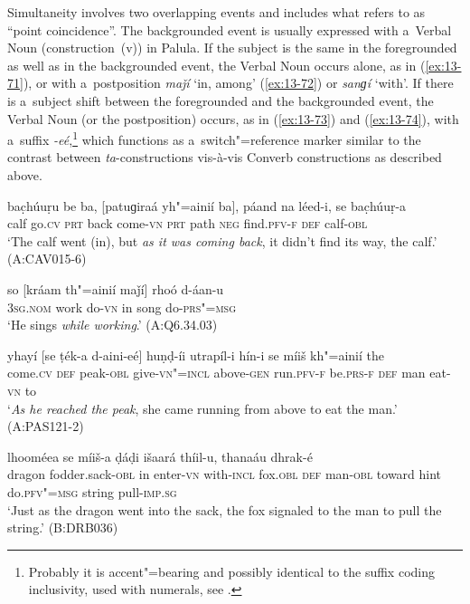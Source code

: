  Simultaneity involves two overlapping events and includes what
\citet[330]{givon2001b} refers to as ``point coincidence''. The backgrounded event
\citep[254--255]{thompsonetal2007} is usually expressed with a~Verbal Noun (construction~(v)) in
Palula. If the subject is the same in the foregrounded as well as in the backgrounded event, the
Verbal Noun occurs alone, as in (\ref{ex:13-71}), or with a~postposition \textit{maǰí} `in,
among' (\ref{ex:13-72}) or \textit{sanɡí} `with'. If there is a~subject shift between
the foregrounded and the backgrounded event, the Verbal Noun (or the postposition) occurs, as in
(\ref{ex:13-73}) and (\ref{ex:13-74}), with a~suffix \textit{-eé},\footnote{Probably it is accent"=bearing and possibly identical to the suffix coding inclusivity, used with numerals, see .} which functions as a~switch"=reference marker similar to the contrast between
\textit{ta}-constructions vis-à-vis Converb constructions as described above.

\begin{exe}
\ex
\label{ex:13-71}
\gll bac̣húuṛu be ba, [patuɡiraá yh"=ainií ba], páand na léed-i, se bac̣húuṛ-a \\
calf go.\textsc{cv} \textsc{prt } back come-\textsc{vn }  \textsc{prt} path \textsc{neg} find.\textsc{pfv-f} \textsc{def} calf-\textsc{obl}  \\
\glt `The calf went (in), but \textit{as it was coming back}, it didn't find its way, the calf.' (A:CAV015-6)

\ex
\label{ex:13-72}
\gll so [kráam th"=ainií maǰí] rhoó d-áan-u  \\
\textsc{3sg.nom} work do-\textsc{vn} in song do-\textsc{prs"=msg}  \\
\glt `He sings \textit{while working}.' (A:Q6.34.03)

\ex
\label{ex:13-73}
\gll yhayí [se ṭék-a d-aini-eé] huṇḍ-íi utrapíl-i hín-i se míiš kh"=ainií the \\
come.\textsc{cv} \textsc{def} peak-\textsc{obl} give-\textsc{vn"=incl} above-\textsc{gen} run.\textsc{pfv-f}  be.\textsc{prs-f } \textsc{def} man eat-\textsc{vn} to  \\
\glt `\textit{As he reached the peak}, she came running from above to eat the man.' (A:PAS121-2)

\ex
\label{ex:13-74}
 lhooméea se míiš-a ḍáḍi išaará thíil-u, thanaáu dhrak-é \\
dragon fodder.sack-\textsc{obl} in enter-\textsc{vn} with-\textsc{incl}  fox.\textsc{obl} \textsc{def} man-\textsc{obl} toward hint do.\textsc{pfv"=msg} string pull-\textsc{imp.sg}  \\
\glt `Just as the dragon went into the sack, the fox signaled to the man to pull the string.' (B:DRB036)
\end{exe}

